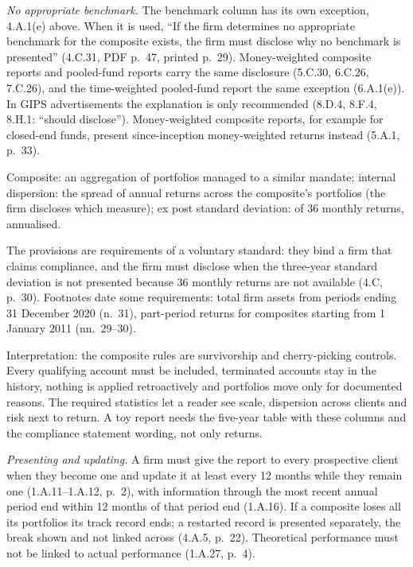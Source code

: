 \begin{qfmethod}
\emph{No appropriate benchmark.} The benchmark column has its own exception, 4.A.1(e) above. When it is used, ``If the firm determines no appropriate benchmark for the composite exists, the firm must disclose why no benchmark is presented'' (4.C.31, PDF p.~47, printed p.~29). Money-weighted composite reports and pooled-fund reports carry the same disclosure (5.C.30, 6.C.26, 7.C.26), and the time-weighted pooled-fund report the same exception (6.A.1(e)). In GIPS advertisements the explanation is only recommended (8.D.4, 8.F.4, 8.H.1: ``should disclose''). Money-weighted composite reports, for example for closed-end funds, present since-inception money-weighted returns instead (5.A.1, p.~33).

 Composite: an aggregation of portfolios managed to a similar mandate; internal dispersion: the spread of annual returns across the composite's portfolios (the firm discloses which measure); ex post standard deviation: of 36 monthly returns, annualised.

 The provisions are requirements of a voluntary standard: they bind a firm that claims compliance, and the firm must disclose when the three-year standard deviation is not presented because 36 monthly returns are not available (4.C, p.~30). Footnotes date some requirements: total firm assets from periods ending 31 December 2020 (n.~31), part-period returns for composites starting from 1 January 2011 (nn.~29--30).

 Interpretation: the composite rules are survivorship and cherry-picking controls. Every qualifying account must be included, terminated accounts stay in the history, nothing is applied retroactively and portfolios move only for documented reasons. The required statistics let a reader see scale, dispersion across clients and risk next to return. A toy report needs the five-year table with these columns and the compliance statement wording, not only returns.

\emph{Presenting and updating.} A firm must give the report to every prospective client when they become one and update it at least every 12 months while they remain one (1.A.11--1.A.12, p.~2), with information through the most recent annual period end within 12 months of that period end (1.A.16). If a composite loses all its portfolios its track record ends; a restarted record is presented separately, the break shown and not linked across (4.A.5, p.~22). Theoretical performance must not be linked to actual performance (1.A.27, p.~4).


\end{qfmethod}
